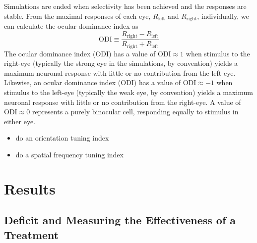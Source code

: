 \documentclass[
  letterpaper,
]{book}
\providecommand{\tightlist}{%
  \setlength{\itemsep}{0pt}\setlength{\parskip}{0pt}}\usepackage{longtable,booktabs,array}
\begin{document}
Simulations are ended when selectivity has been achieved and the
responses are stable. From the maximal responses of each eye,
\(R_{\text{left}}\) and \(R_{\text{right}}\), individually, we can
calculate the ocular dominance index as \[
\text{ODI} \equiv \frac{R_{\text{right}}-R_{\text{left}}}{R_{\text{right}}+R_{\text{left}}}
\] The ocular dominance index (ODI) has a value of
\(\text{ODI} \approx 1\) when stimulus to the right-eye (typically the
strong eye in the simulations, by convention) yields a maximum neuronal
response with little or no contribution from the left-eye. Likewise, an
ocular dominance index (ODI) has a value of \(\text{ODI} \approx -1\)
when stimulus to the left-eye (typically the weak eye, by convention)
yields a maximum neuronal response with little or no contribution from
the right-eye. A value of \(\text{ODI} \approx 0\) represents a purely
binocular cell, responding equally to stimulus in either eye.

\begin{tcolorbox}[enhanced jigsaw, left=2mm, opacitybacktitle=0.6, title=\textcolor{quarto-callout-important-color}{\faExclamation}\hspace{0.5em}{Important}, breakable, colback=white, toprule=.15mm, colbacktitle=quarto-callout-important-color!10!white, leftrule=.75mm, bottomtitle=1mm, toptitle=1mm, coltitle=black, colframe=quarto-callout-important-color-frame, opacityback=0, titlerule=0mm, arc=.35mm, rightrule=.15mm, bottomrule=.15mm]

\begin{itemize}
\tightlist
\item
  do an orientation tuning index
\item
  do a spatial frequency tuning index
\end{itemize}

\end{tcolorbox}

\part{Results}

\hypertarget{deficit-and-measuring-the-effectiveness-of-a-treatment}{%
\chapter{Deficit and Measuring the Effectiveness of a
Treatment}\label{deficit-and-measuring-the-effectiveness-of-a-treatment}}
\end{document}
